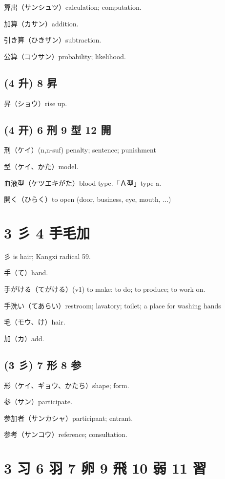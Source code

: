 算出（サンシュツ）calculation; computation.

加算（カサン）addition.

引き算（ひきザン）subtraction.

公算（コウサン）probability; likelihood.

\subsection{(4 升) 8 昇}

昇（ショウ）rise up.

\subsection{(4 开) 6 刑 9 型 12 開}

刑（ケイ）(n,n-suf) penalty; sentence; punishment

型（ケイ、かた）model.

血液型（ケツエキがた）blood type.「Ａ型」type a.

開く（ひらく）to open (door, business, eye, mouth, ...)

\section{3 彡 4 手毛加}

彡 is hair; Kangxi radical 59.

手（て）hand.

手がける（てがける）(v1) to make; to do; to produce; to work on.

手洗い（てあらい）restroom; lavatory; toilet; a place for washing hands

毛（モウ、け）hair.

加（カ）add.

\subsection{(3 彡) 7 形 8 参}

形（ケイ、ギョウ、かたち）shape; form.

参（サン）participate.

参加者（サンカシャ）participant; entrant.

参考（サンコウ）reference; consultation.

\section{3 习 6 羽 7 卵 9 飛 10 弱 11 習}

